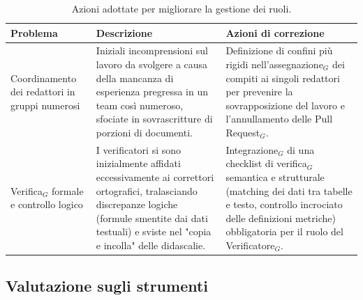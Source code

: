 \documentclass[a4paper, 10pt, colorlinks=true, linkcolor=black, urlcolor=blue, citecolor=blue, hidelinks]{article}
\begin{document}
\begin{table}[H]
    \centering
    \renewcommand{\arraystretch}{1.5}
    \begin{tabularx}{\textwidth}{|>{\raggedright\arraybackslash}p{3.5cm}|>{\raggedright\arraybackslash}X|>{\raggedright\arraybackslash}X|}
        \hline
        \textbf{Problema} & \textbf{Descrizione} & \textbf{Azioni di correzione} \\ \hline
        
        Coordinamento dei redattori in gruppi numerosi & Iniziali incomprensioni sul lavoro da svolgere a causa della mancanza di esperienza pregressa in un team così numeroso, sfociate in sovrascritture di porzioni di documenti. & Definizione di confini più rigidi nell'assegnazione$_G$ dei compiti ai singoli redattori per prevenire la sovrapposizione del lavoro e l'annullamento delle Pull Request$_G$. \\ \hline
        
        Verifica$_G$ formale e controllo logico & I verificatori si sono inizialmente affidati eccessivamente ai correttori ortografici, tralasciando discrepanze logiche (formule smentite dai dati testuali) e sviste nel "copia e incolla" delle didascalie. & Integrazione$_G$ di una checklist di verifica$_G$ semantica e strutturale (matching dei dati tra tabelle e testo, controllo incrociato delle definizioni metriche) obbligatoria per il ruolo del Verificatore$_G$. \\ \hline
    \end{tabularx}
    \caption{Azioni adottate per migliorare la gestione dei ruoli.}
    \label{tab:azioni-ruoli}
\end{table}

\subsection{Valutazione sugli strumenti}
\end{document}
